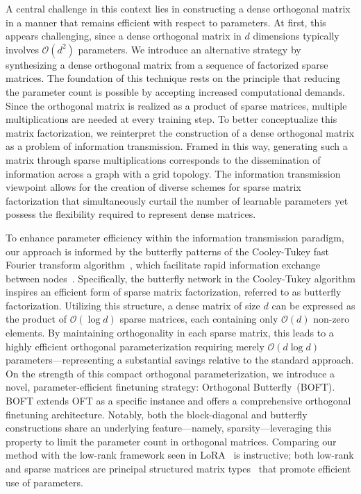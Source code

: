 A central challenge in this context lies in constructing a dense orthogonal matrix in a manner that remains efficient with respect to parameters. At first, this appears challenging, since a dense orthogonal matrix in $d$ dimensions typically involves $\mathcal{O}(d^2)$ parameters. We introduce an alternative strategy by synthesizing a dense orthogonal matrix from a sequence of factorized sparse matrices. The foundation of this technique rests on the principle that reducing the parameter count is possible by accepting increased computational demands. Since the orthogonal matrix is realized as a product of sparse matrices, multiple multiplications are needed at every training step. To better conceptualize this matrix factorization, we reinterpret the construction of a dense orthogonal matrix as a problem of information transmission. Framed in this way, generating such a matrix through sparse multiplications corresponds to the dissemination of information across a graph with a grid topology. The information transmission viewpoint allows for the creation of diverse schemes for sparse matrix factorization that simultaneously curtail the number of learnable parameters yet possess the flexibility required to represent dense matrices.

To enhance parameter efficiency within the information transmission paradigm, our approach is informed by the butterfly patterns of the Cooley-Tukey fast Fourier transform algorithm~\cite{cooley1965algorithm}, which facilitate rapid information exchange between nodes~\cite{klasing1994broadcasting}. Specifically, the butterfly network in the Cooley-Tukey algorithm inspires an efficient form of sparse matrix factorization, referred to as butterfly factorization. Utilizing this structure, a dense matrix of size $d$ can be expressed as the product of $\mathcal{O}(\log d)$ sparse matrices, each containing only $\mathcal{O}(d)$ non-zero elements. By maintaining orthogonality in each sparse matrix, this leads to a highly efficient orthogonal parameterization requiring merely $\mathcal{O}(d\log d)$ parameters—representing a substantial savings relative to the standard approach. On the strength of this compact orthogonal parameterization, we introduce a novel, parameter-efficient finetuning strategy: Orthogonal Butterfly~(BOFT). BOFT extends OFT as a specific instance and offers a comprehensive orthogonal finetuning architecture. Notably, both the block-diagonal and butterfly constructions share an underlying feature—namely, sparsity—leveraging this property to limit the parameter count in orthogonal matrices. Comparing our method with the low-rank framework seen in LoRA~\cite{hulora2022} is instructive; both low-rank and sparse matrices are principal structured matrix types~\cite{candes2011robust} that promote efficient use of parameters.

